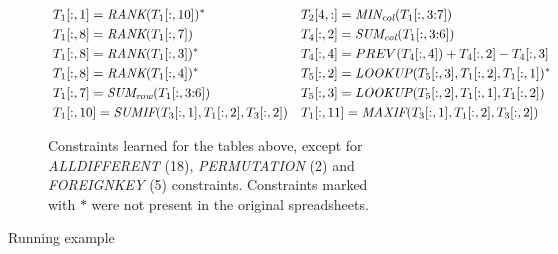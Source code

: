 \begin{figure}[thb]
\begin{subfigure}{1\textwidth}
{\begin{align*}
      &~\ecrank{\range{T_{1}}{\rangeall}{1}}{\range{T_{1}}{\rangeall}{10}}^*    && \ecaggc{\textit{MIN}}{\range{T_{2}}{4}{\rangeall}}{\range{T_{1}}{\rangeall}{\rangeto{3}{7}}} \\
      &~\ecrank{\range{T_{1}}{\rangeall}{8}}{\range{T_{1}}{\rangeall}{7}}       && \ecsumc{\range{T_{4}}{\rangeall}{2}}{\range{T_{1}}{\rangeall}{\rangeto{3}{6}}} \\
      &~\ecrank{\range{T_{1}}{\rangeall}{8}}{\range{T_{1}}{\rangeall}{3}}^*     && \range{T_{4}}{\rangeall}{4} = PREV(\range{T_{4}}{\rangeall}{4}) + \range{T_{4}}{\rangeall}{2} - \range{T_{4}}{\rangeall}{3} \\
      &~\ecrank{\range{T_{1}}{\rangeall}{8}}{\range{T_{1}}{\rangeall}{4}}^*    && \eclookup{\range{T_{5}}{\rangeall}{2}}{\range{T_{5}}{\rangeall}{3}}{\range{T_{1}}{\rangeall}{2}}{\range{T_{1}}{\rangeall}{1}}^*\\
%
      &~\ecsumr{\range{T_{1}}{\rangeall}{7}}{\range{T_{1}}{\rangeall}{\rangeto{3}{6}}}   && \eclookup{\range{T_{5}}{\rangeall}{3}}{\range{T_{5}}{\rangeall}{2}}{\range{T_{1}}{\rangeall}{1}}{\range{T_{1}}{\rangeall}{2}} \\
%
      &~\ecaggif{\textit{SUM}}{\range{T_{1}}{\rangeall}{10}}{\range{T_{3}}{\rangeall}{1}}{\range{T_{1}}{\rangeall}{2}}{\range{T_{3}}{\rangeall}{2}}   && \ecaggif{\textit{MAX}}{\range{T_{1}}{\rangeall}{11}}{\range{T_{3}}{\rangeall}{1}}{\range{T_{1}}{\rangeall}{2}}{\range{T_{3}}{\rangeall}{2}} 
%
%
%
%
%
%
%
%
    \end{align*}}
  \vspace{-10pt}
  \caption{Constraints learned for the tables above, except for \textit{ALLDIFFERENT} (18), \textit{PERMUTATION} (2) and \textit{FOREIGNKEY} (5) constraints.
  Constraints marked with $*$ were not present in the original spreadsheets.}
  \label{fig:sol_example}
\end{subfigure}
  \caption{Running example}
\end{figure}


